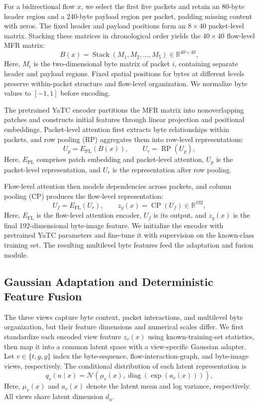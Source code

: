 For a bidirectional flow $x$, we select the first five packets and retain an 80-byte header region and a 240-byte payload region per packet, padding missing content with zeros. The fixed header and payload positions form an $8\times40$ packet-level matrix. Stacking these matrices in chronological order yields the $40\times40$ flow-level MFR matrix:
\begin{equation}
B(x)=\operatorname{Stack}(M_1,M_2,\ldots,M_5)
\in\mathbb{R}^{40\times40},
\tag{5}
\end{equation}
Here, $M_i$ is the two-dimensional byte matrix of packet $i$, containing separate header and payload regions. Fixed spatial positions for bytes at different levels preserve within-packet structure and flow-level organization. We normalize byte values to $[-1,1]$ before encoding.

The pretrained YaTC encoder partitions the MFR matrix into nonoverlapping patches and constructs initial features through linear projection and positional embeddings. Packet-level attention first extracts byte relationships within packets, and row pooling (RP) aggregates them into row-level representations:
\begin{equation}
U_p=E_{\mathrm{PL}}(B(x)),\qquad
U_r=\operatorname{RP}(U_p),
\tag{6}
\end{equation}
Here, $E_{\mathrm{PL}}$ comprises patch embedding and packet-level attention, $U_p$ is the packet-level representation, and $U_r$ is the representation after row pooling.

Flow-level attention then models dependencies across packets, and column pooling (CP) produces the flow-level representation:
\begin{equation}
U_f=E_{\mathrm{FL}}(U_r),\qquad
z_y(x)=\operatorname{CP}(U_f)\in\mathbb{R}^{192},
\tag{7}
\end{equation}
Here, $E_{\mathrm{FL}}$ is the flow-level attention encoder, $U_f$ is its output, and $z_y(x)$ is the final 192-dimensional byte-image feature. We initialize the encoder with pretrained YaTC parameters and fine-tune it with supervision on the known-class training set. The resulting multilevel byte features feed the adaptation and fusion module.

\subsection{Gaussian Adaptation and Deterministic Feature Fusion}
The three views capture byte context, packet interactions, and multilevel byte organization, but their feature dimensions and numerical scales differ. We first standardize each encoded view feature $z_v(x)$ using known-training-set statistics, then map it into a common latent space with a view-specific Gaussian adapter. Let $v\in\{t,g,y\}$ index the byte-sequence, flow-interaction-graph, and byte-image views, respectively. The conditional distribution of each latent representation is
\begin{equation}
q_v(u\mid x)
=
\mathcal{N}
\left(
\mu_v(x),
\operatorname{diag}\left(\exp(a_v(x))\right)
\right),
\tag{8}
\end{equation}
Here, $\mu_v(x)$ and $a_v(x)$ denote the latent mean and log variance, respectively. All views share latent dimension $d_u$.

